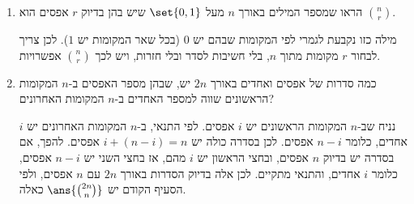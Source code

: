 \begin{enumerate}
\item הראו שמספר המילים באורך $n$ מעל $\set{0,1}$ שיש בהן בדיוק $r$ אפסים הוא $\binom nr$.
\begin{solbox}
מילה כזו נקבעת לגמרי לפי המקומות שבהם יש $0$ (בכל שאר המקומות יש $1$). לכן צריך לבחור $r$ מקומות מתוך $n$, בלי חשיבות לסדר ובלי חזרות, ויש לכך $\binom nr$ אפשרויות.
\end{solbox}
\item כמה סדרות של אפסים ואחדים באורך $2n$ יש, שבהן מספר האפסים ב-$n$ המקומות הראשונים שווה למספר האחדים ב-$n$ המקומות האחרונים?
\begin{solbox}
נניח שב-$n$ המקומות הראשונים יש $i$ אפסים. לפי התנאי, ב-$n$ המקומות האחרונים יש $i$ אחדים, כלומר $n-i$ אפסים. לכן בסדרה כולה יש $i+(n-i)=n$ אפסים.
להפך, אם בסדרה יש בדיוק $n$ אפסים, ובחצי הראשון יש $i$ מהם, אז בחצי השני יש $n-i$ אפסים, כלומר $i$ אחדים, והתנאי מתקיים.
לכן אלה בדיוק הסדרות באורך $2n$ עם $n$ אפסים, ולפי הסעיף הקודם יש $\ans{\binom{2n}n}$ כאלה.
\end{solbox}
\end{enumerate}
